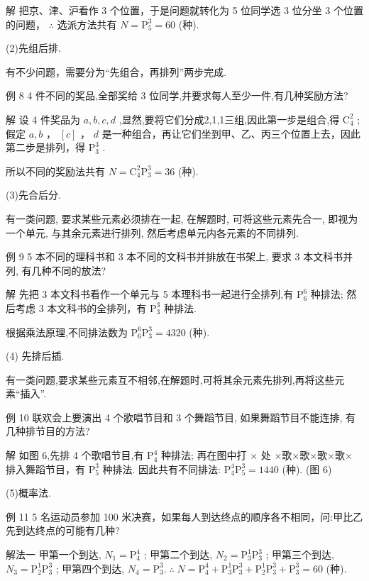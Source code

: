 \documentclass[10pt]{article}
\begin{document}
解 把京、津、沪看作 3 个位置，于是问题就转化为 5 位同学选 3 位分坐 3 个位置的问题， \(\therefore\) 选派方法共有 \(N = {\mathrm{P}}_{5}^{3} = {60}\) (种).

(2)先组后排.

有不少问题，需要分为“先组合，再排列”两步完成.

例 8 4 件不同的奖品,全部奖给 3 位同学,并要求每人至少一件,有几种奖励方法?

解 设 4 件奖品为 \(a,b,c,d\) ,显然,要将它们分成2,1,1三组,因此第一步是组合,得 \({\mathrm{C}}_{4}^{2}\) ; 假定 \(a,b\) ， \(\left\lbrack  c\right\rbrack\) ， \(d\) 是一种组合，再让它们坐到甲、乙、丙三个位置上去，因此第二步是排列，得 \({\mathrm{P}}_{3}^{3}\) .

所以不同的奖励法共有 \(N = {\mathrm{C}}_{4}^{2}{\mathrm{P}}_{3}^{3} = {36}\) (种).

(3)先合后分.

有一类问题, 要求某些元素必须排在一起, 在解题时, 可将这些元素先合一, 即视为一个单元, 与其余元素进行排列, 然后考虑单元内各元素的不同排列.

例 9 5 本不同的理科书和 3 本不同的文科书并排放在书架上, 要求 3 本文科书并列, 有几种不同的放法?

解 先把 3 本文科书看作一个单元与 5 本理科书一起进行全排列,有 \({\mathrm{P}}_{6}^{6}\) 种排法; 然后考虑 3 本文科书的全排列，有 \({\mathrm{P}}_{3}^{3}\) 种排法.

根据乘法原理,不同排法数为 \({\mathrm{P}}_{6}^{6}{\mathrm{P}}_{3}^{3} = {4320}\) (种).

(4) 先排后插.

有一类问题,要求某些元素互不相邻,在解题时,可将其余元素先排列,再将这些元素“插入”.

例 10 联欢会上要演出 4 个歌唱节目和 3 个舞蹈节目, 如果舞蹈节目不能连排, 有几种排节目的方法?

解 如图 6,先排 4 个歌唱节目,有 \({\mathrm{P}}_{4}^{4}\) 种排法; 再在图中打 \(\times\) 处 ×歌×歌×歌×歌× 排入舞蹈节目，有 \({\mathrm{P}}_{5}^{3}\) 种排法. 因此共有不同排法: \({\mathrm{P}}_{4}^{4}{\mathrm{P}}_{5}^{3} = {1440}\) (种). (图 6)

(5)概率法.

例 11 5 名运动员参加 100 米决赛，如果每人到达终点的顺序各不相同，问:甲比乙先到达终点的可能有几种?

解法一 甲第一个到达, \({N}_{1} = {\mathrm{P}}_{4}^{4}\) ; 甲第二个到达, \({N}_{2} = {\mathrm{P}}_{3}^{1}{\mathrm{P}}_{3}^{3}\) ; 甲第三个到达, \({N}_{3} = {\mathrm{P}}_{2}^{1}{\mathrm{P}}_{3}^{3}\) ; 甲第四个到达, \({N}_{4} = {\mathrm{P}}_{3}^{3}.\;\therefore \;N = {\mathrm{P}}_{4}^{4} + {\mathrm{P}}_{3}^{1}{\mathrm{P}}_{3}^{3} + {\mathrm{P}}_{2}^{1}{\mathrm{P}}_{3}^{3} + {\mathrm{P}}_{3}^{3} = {60}\) (种).
\end{document}
